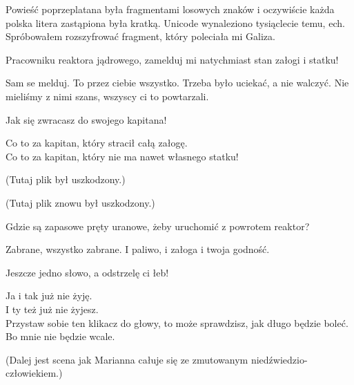 Powieść poprzeplatana była fragmentami losowych znaków i oczywiście każda polska litera zastąpiona była kratką. Unicode wynaleziono tysiąclecie temu, ech.
Spróbowałem rozszyfrować fragment, który poleciała mi Galiza.

\begin{poem}
	
	\charkap{}
	Pracowniku reaktora jądrowego, zamelduj mi natychmiast stan załogi i statku!
	
	\charkos{}
	Sam se melduj. To przez ciebie wszystko. Trzeba było uciekać, a nie walczyć.
	Nie mieliśmy z nimi szans, wszyscy ci to powtarzali.
	
	\charkap{}
	Jak się zwracasz do swojego kapitana!
	
	\charkos{}
	Co to za kapitan, który stracił całą załogę. \\
	Co to za kapitan, który nie ma nawet własnego statku!
\end{poem}
	(Tutaj plik był uszkodzony.)
\begin{poem}
\end{poem}
	(Tutaj plik znowu był uszkodzony.)
\begin{poem}
	Gdzie są zapasowe pręty uranowe, żeby uruchomić z powrotem reaktor?
	
	\charkos{}
	Zabrane, wszystko zabrane.
	I paliwo, i załoga i twoja godność.
	
	\charkap{}
	Jeszcze jedno słowo, a odstrzelę ci łeb!
	
	\charkos{}
	Ja i tak już nie żyję. \\
	I ty też już nie żyjesz. \\
	Przystaw sobie ten klikacz do głowy, to może sprawdzisz, jak długo będzie boleć. \\
	Bo mnie nie będzie wcale.
	
	
	(Dalej jest scena jak Marianna całuje się ze zmutowanym niedźwiedzio-człowiekiem.)
\end{poem}

